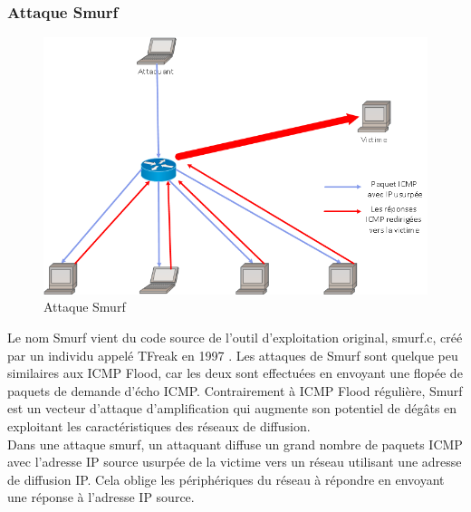 	\subsubsection{Attaque Smurf}
	\begin{figure}[h]
		\begin{center}
			\includegraphics[width=\textwidth]{IMAGES/ORIGINALS/Attaque_Smurf}
		\end{center}
		\caption{Attaque Smurf}
	\end{figure}
		
	Le nom Smurf vient du code source de l'outil d'exploitation original, smurf.c, créé par un individu appelé TFreak en 1997 \cite{ciscoguideagainstddos}. 
Les attaques de Smurf sont quelque peu similaires aux ICMP Flood, car les deux sont effectuées en envoyant une flopée de paquets de demande d'écho ICMP.
Contrairement à ICMP Flood régulière, Smurf est un vecteur d'attaque d'amplification qui augmente son potentiel de dégâts en exploitant les caractéristiques des réseaux de diffusion.\\

	Dans une attaque smurf, un attaquant diffuse un grand nombre de paquets ICMP avec l'adresse IP source usurpée de la victime vers un réseau utilisant une adresse de diffusion IP. Cela oblige les périphériques du réseau à répondre en envoyant une réponse à l'adresse IP source.
	
	\pagebreak
